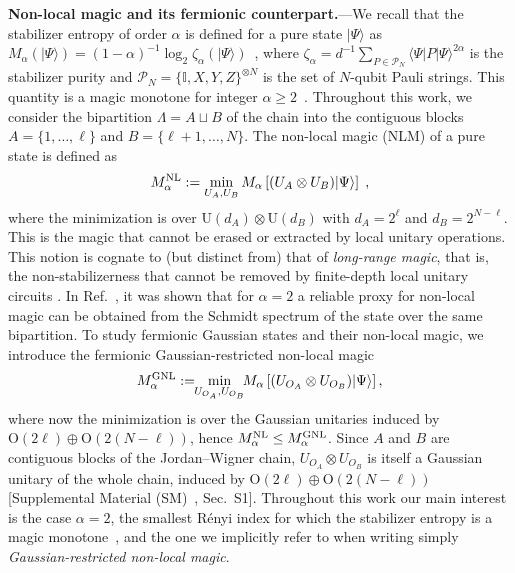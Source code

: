 \documentclass[aps,prl,twocolumn,superscriptaddress,reprint,longbibliography,nofootinbib]{revtex4-2}
\newcommand{\RENYI}{\alpha}
\begin{document}
\textbf{Non-local magic and its fermionic counterpart.}---We recall that the stabilizer entropy of order $\RENYI$ is defined for a pure state $|\Psi\rangle$ as $M_\RENYI(|\Psi\rangle)=(1-\RENYI)^{-1}\log_2 \zeta_\RENYI(|\Psi\rangle)$~\cite{Leone2022SRE}, where $\zeta_\RENYI= d^{-1}\sum_{P\in \mathcal{P}_N} \langle \Psi|P|\Psi\rangle^{2\RENYI}$ is the stabilizer purity and $\mathcal{P}_N=\{ \mathbb{I},X,Y,Z\}^{\otimes N}$  is the set of $N$-qubit Pauli strings. This quantity is a magic monotone for integer $\RENYI\ge 2$~\cite{piro,leone2024stabilizer}.
Throughout this work, we consider the bipartition $\Lambda = A\sqcup B$ of the chain into the contiguous blocks $A=\{1,\dots,\ell\}$ and $B=\{\ell+1,\dots,N\}$. The non-local magic (NLM) of a pure state is defined as
\begin{equation}
    M_\RENYI^\textup{NL}:= \min_{U_A , U_B} M_\RENYI\left[(U_A\otimes U_B)|\Psi\rangle\right]\;,\label{eq:defNLmagic}
\end{equation}
where the minimization is over $\mathrm{U}(d_A)\otimes \mathrm{U}(d_B)$ with $d_A=2^{\ell}$ and $d_B = 2^{N-\ell}$. This is the magic that cannot be erased or extracted by local unitary operations. This notion is cognate to (but distinct from) that of {\em long-range magic}, that is, the non-stabilizerness that cannot be removed by finite-depth local unitary circuits \cite{Korbany2025}.
In Ref.~\cite{Cao_2025}, it was shown that for $\RENYI = 2$ a reliable proxy for non-local magic can be obtained from the Schmidt spectrum of the state over the same bipartition.
To study fermionic Gaussian states and their non-local magic, we introduce the fermionic Gaussian-restricted non-local magic
\begin{equation}
    M_\RENYI^\textup{GNL}:= \!\!\min_{U_{O_A} , U_{O_B}} \!\!M_\RENYI\left[(U_{O_A}\otimes U_{O_B})|\Psi\rangle\right],\label{eq:defGNLmagic}
\end{equation}
where now the minimization is over the Gaussian unitaries induced by $\mathrm{O}(2\ell)\oplus \mathrm{O}(2(N-\ell))$, hence $ M_\RENYI^\textup{NL} \leq  M_\RENYI^\textup{GNL}$. Since $A$ and $B$ are contiguous blocks of the Jordan--Wigner chain, $U_{O_A}\otimes U_{O_B}$ is itself a Gaussian unitary of the whole chain, induced by $\mathrm{O}(2\ell)\oplus\mathrm{O}(2(N-\ell))$ [Supplemental Material (SM)~\cite{SM}, Sec.~S1].
Throughout this work our main interest is the case $\RENYI=2$, the smallest R\'enyi index for which the stabilizer entropy is a magic monotone~\cite{piro,leone2024stabilizer}, and the one we implicitly refer to when writing simply \emph{Gaussian-restricted non-local magic}.
\end{document}
